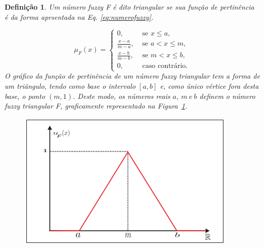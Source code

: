 \documentclass[tcc,capa]{texufpel}
\newtheorem{Def}{Defini\c c\~ao}
\begin{document}
\begin{Def}
Um número fuzzy F é dito triangular se sua função de pertinência é da forma aprsentada na Eq. \ref{eq:numerofuzzy}.

\begin{equation} \label{eq:numerofuzzy}
 \mu_{F}(x)=
  \left \{
   \begin{array}{ll}
  0,  & \mbox{ se $x \leq a,$} \\
  \frac{x-a}{m-a}, & \mbox{ se $a < x \leq m,$} \\
  \frac{x-b}{m-b}, & \mbox{ se $m < x \leq b,$} \\
  0, & \mbox{ caso contrário.}
   \end{array}
  \right.
\end{equation} 
O gráfico da função de pertinência de um número fuzzy triangular tem a forma de um triângulo, tendo como base o intervalo $[a,b]$ e, como único vértice fora desta base, o ponto $(m,1)$. Deste modo, os números reais $a,~m ~e~ b$ definem o número fuzzy triangular F, graficamente representado na Figura~\ref{fig:NFuzzyTriangular}.
\begin{figure}[ht]
\centering
\includegraphics[scale=0.5]{images/numero_fuzzy_triangular.png}
\label{fig:NFuzzyTriangular}
\end{figure}

\end{Def}

\newpage
\end{document}
